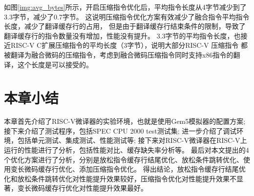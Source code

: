 如图\ref{img:avg_bytes}所示，开启压缩指令优化后，平均指令长度从4字节减少到了3.3字节，减少了0.7字节。
这说明压缩指令优化方案有效减少了融合指令平均指令长度，减少了翻译缓存行的占用，
但是由于翻译缓存行结束条件的限制，导致了翻译缓存行的指令数量没有增加，性能没有提升。
3.3字节的平均指令长度，也接近RISC-V C扩展压缩指令的平均长度（3字节），说明大部分RISC-V 压缩指令
都被翻译为融合微码的压缩指令，考虑到融合微码压缩指令同时支持x86指令的翻译，这个长度是可以接受的。


\section{本章小结}

本章首先介绍了RISC-V微译器的实验环境，也就是使用Gem5模拟器的配置方案;
接下来介绍了测试程序，包括SPEC CPU 2000 test测试集;
进一步介绍了调试环境，包括单元测试、集成测试、性能测试等;
接下来对RISC-V微译器在RISC-V上运行的性能进行了分析，包括性能对比、缓存缺失率分析等。
最后对本文提出的4个优化方案进行了分析，分别是放松指令缓存行结尾优化、放松条件跳转优化、使用变长微码缓存行优化、添加压缩指令优化。
得出结论，放松指令缓存行结尾优化和放松条件跳转优化对性能提升效果较好，压缩指令优化对性能提升效果不显著，变长微码缓存行优化对性能提升效果最好。